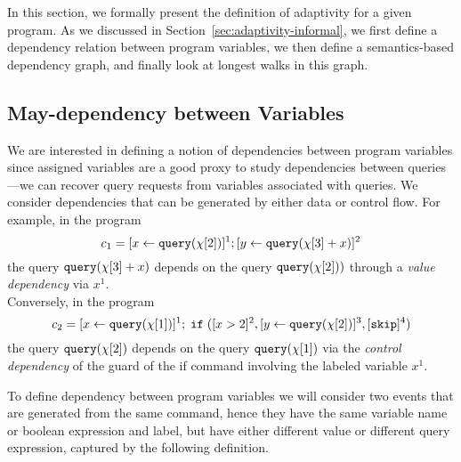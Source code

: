 In this section, we formally present the definition of adaptivity for a given program.
As we discussed in Section~\ref{sec:adaptivity-informal}, we first define a dependency relation between program variables,
we then define a semantics-based dependency graph, and finally look at longest walks in this graph. 

\subsection{May-dependency between Variables}
\label{sec:dep}
We are interested in defining a notion of dependencies between program variables since assigned variables are a good proxy to study dependencies between queries---we can recover query requests from variables associated with queries. We consider dependencies that can be generated by either data or control flow.
For example, in the program 
\[c_1 =[\mathrel{ x \leftarrow {\tt query}(\chi[2]) }]^1 ;[\mathrel{ y \leftarrow {\tt query}(\chi[3] + x) }]^2\]
the query ${\tt query}(\chi[3] + x)$  depends on the query ${\tt query}(\chi[2]))$ through a \emph{value dependency} via  $x^1$.
\\
Conversely, in the program
\[c_2 = [\mathrel{ x \leftarrow {\tt query}(\chi[1]) }]^1 ; \;\mathtt{if}\;( [x > 2]^2 , [\mathrel{ y \leftarrow {\tt query}(\chi[2]) }]^3, [\mathtt{skip}]^4 )\] 
the query ${\tt query}(\chi[2])$ 
depends on the query ${\tt query}(\chi[1])$ via the \emph{control dependency} of the guard of the if command involving the labeled variable $x^1$.

To define dependency between program variables we will consider two events that are generated from the same command, hence they have the same variable name or boolean expression and label, but have either different value or different query expression, captured by the following definition. 

